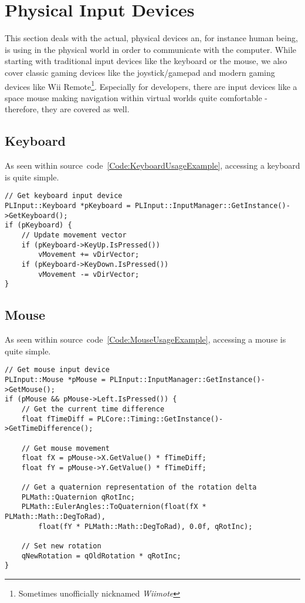 \section{Physical Input Devices}
\label{Chapter:PhysicalInputDevices}
This section deals with the actual, physical devices an, for instance human being, is using in the physical world in order to communicate with the computer. While starting with traditional input devices like the keyboard or the mouse, we also cover classic gaming devices like the joystick/gamepad and modern gaming devices like Wii Remote\footnote{Sometimes unofficially nicknamed \emph{Wiimote}}. Especially for developers, there are input devices like a space mouse making navigation within virtual worlds quite comfortable - therefore, they are covered as well.




\subsection{Keyboard}
As seen within source~code~\ref{Code:KeyboardUsageExample}, accessing a keyboard is quite simple.
\begin{lstlisting}[float=htb,label=Code:KeyboardUsageExample,caption={Keyboard usage example}]
// Get keyboard input device
PLInput::Keyboard *pKeyboard = PLInput::InputManager::GetInstance()->GetKeyboard();
if (pKeyboard) {
	// Update movement vector
	if (pKeyboard->KeyUp.IsPressed())
		vMovement += vDirVector;
	if (pKeyboard->KeyDown.IsPressed())
		vMovement -= vDirVector;
}
\end{lstlisting}




\subsection{Mouse}
As seen within source~code~\ref{Code:MouseUsageExample}, accessing a mouse is quite simple.
\begin{lstlisting}[float=htb,label=Code:MouseUsageExample,caption={Mouse usage example}]
// Get mouse input device
PLInput::Mouse *pMouse = PLInput::InputManager::GetInstance()->GetMouse();
if (pMouse && pMouse->Left.IsPressed()) {
	// Get the current time difference
	float fTimeDiff = PLCore::Timing::GetInstance()->GetTimeDifference();

	// Get mouse movement
	float fX = pMouse->X.GetValue() * fTimeDiff;
	float fY = pMouse->Y.GetValue() * fTimeDiff;

	// Get a quaternion representation of the rotation delta
	PLMath::Quaternion qRotInc;
	PLMath::EulerAngles::ToQuaternion(float(fX * PLMath::Math::DegToRad),
		float(fY * PLMath::Math::DegToRad), 0.0f, qRotInc);

	// Set new rotation
	qNewRotation = qOldRotation * qRotInc;
}
\end{lstlisting}




